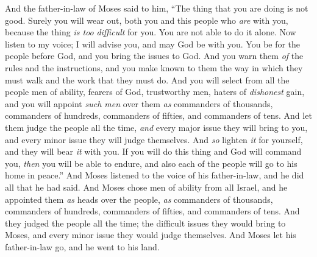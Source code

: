 \begin{biblechapter}
\verse And the father-in-law of Moses said to him, “The thing that you are doing is not good.
\verse Surely you will wear out, both you and this people who \textit{are} with you, because the thing \textit{is too} \textit{difficult} for you. You are not able to do it alone.
\verse Now listen to my voice; I will advise you, and may God be with you. You be for the people before God, and you bring the issues to God.
\verse And you warn them \textit{of} the rules and the instructions, and you make known to them the way in which they must walk and the work that they must do.
\verse And you will select from all the people men of ability, fearers of God, trustworthy men, haters of \textit{dishonest} gain, and you will appoint \textit{such men} over them \textit{as} commanders of thousands, commanders of hundreds, commanders of fifties, and commanders of tens.
\verse And let them judge the people all the time, \textit{and} every major issue they will bring to you, and every minor issue they will judge themselves. And \textit{so} lighten \textit{it} for yourself, and they will bear \textit{it} with you.
\verse If you will do this thing and God will command you, \textit{then} you will be able to endure, and also each of the people will go to his home in peace.”
\verse And Moses listened to the voice of his father-in-law, and he did all that he had said.
\verse And Moses chose men of ability from all Israel, and he appointed them \textit{as} heads over the people, \textit{as} commanders of thousands, commanders of hundreds, commanders of fifties, and commanders of tens.
\verse And they judged the people all the time; the difficult issues they would bring to Moses, and every minor issue they would judge themselves.
\verse And Moses let his father-in-law go, and he went to his land.
\end{biblechapter}

